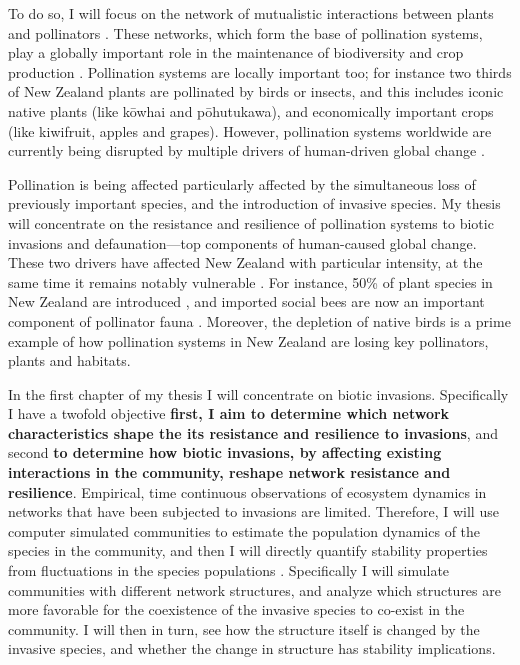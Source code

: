 \documentclass[a4paper]{article}
\begin{document}
To do so, I will focus on the network of mutualistic interactions between plants and pollinators \citep{Bascompte2006, Bascompte2007, Klein2007}.
These networks, which form the base of pollination systems, play a globally important role in the maintenance of biodiversity and crop production \citep{Bascompte2007, Klein2007}.
Pollination systems are locally important too; for instance two thirds of New Zealand plants are pollinated by birds or insects\citep{Cox2000}, and this includes iconic native plants (like k\={o}whai and p\={o}hutukawa), and economically important crops (like kiwifruit, apples and grapes). However, pollination systems worldwide are currently being disrupted by multiple drivers of human-driven global change \citep{Cox2000}.

Pollination is being affected particularly affected by the simultaneous loss of previously important species, and the introduction of invasive species.
My thesis will concentrate on the resistance and resilience of pollination systems to biotic invasions and defaunation---top components of human-caused global change.
These two drivers have affected New Zealand with particular intensity, at the same time it remains notably vulnerable \citep{Vitousek1997}.
For instance, 50\% of plant species in New Zealand are introduced \citep{Wilton2000}, and imported social bees are now an important component of pollinator fauna \citep{Lloyd1985, Newstrom2005}.
Moreover, the depletion of native birds \citep{Anderson2003, Robertson2009} is a prime example of how pollination systems in New Zealand are losing key pollinators, plants and habitats\citep{Cox2000}.

In the first chapter of my thesis I will concentrate on biotic invasions.
Specifically I have a twofold objective \textbf{first, I aim to determine which network characteristics shape the its resistance and resilience to invasions}, and second \textbf{to determine how biotic invasions, by affecting existing interactions in the community, reshape network resistance and resilience}.
Empirical, time continuous observations of ecosystem dynamics in networks that have been subjected to invasions are limited.
Therefore, I will use computer simulated communities to estimate the population dynamics of the species in the community, and then I will directly quantify stability properties from fluctuations in the species populations \citep{Bastolla2009, Garcia-Algarra2013}.
Specifically I will simulate communities with different network structures, and analyze which structures are more favorable for the coexistence of the invasive species to co-exist in the community.
I will then in turn, see how the structure itself is changed by the invasive species, and whether the change in structure has stability implications.
\end{document}
